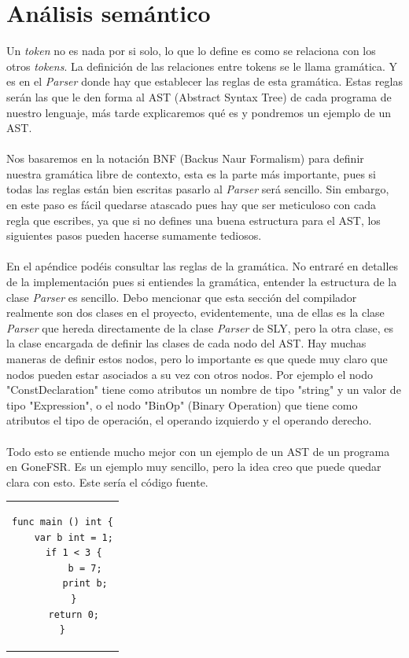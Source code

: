 \section{Análisis semántico}
Un \textit{token} no es nada por si solo, lo que lo define es como se relaciona con los otros \textit{tokens}. La definición de las relaciones entre tokens se le llama gramática. Y es en el \textit{Parser} donde hay que establecer las reglas de esta gramática. Estas reglas serán las que le den forma al AST (Abstract Syntax Tree) de cada programa de nuestro lenguaje, más tarde explicaremos qué es y pondremos un ejemplo de un AST.\\\\
Nos basaremos en la notación BNF (Backus Naur Formalism) para definir nuestra gramática libre de contexto, esta es la parte más importante, pues si todas las reglas están bien escritas pasarlo al \textit{Parser} será sencillo. Sin embargo, en este paso es fácil quedarse atascado pues hay que ser meticuloso con cada regla que escribes, ya que si no defines una buena estructura para el AST, los siguientes pasos pueden hacerse sumamente tediosos. \\\\
En el apéndice podéis consultar las reglas de la gramática. No entraré en detalles de la implementación pues si entiendes la gramática, entender la estructura de la clase \textit{Parser} es sencillo. Debo mencionar que esta sección del compilador realmente son dos clases en el proyecto, evidentemente, una de ellas es la clase \textit{Parser} que hereda directamente de la clase \textit{Parser} de SLY, pero la otra clase, es la clase encargada de definir las clases de cada nodo del AST. Hay muchas maneras de definir estos nodos, pero lo importante es que quede muy claro que nodos pueden estar asociados a su vez con otros nodos. Por ejemplo el nodo "ConstDeclaration" tiene como atributos un nombre de tipo "string" y un valor de tipo "Expression", o el nodo "BinOp" (Binary Operation) que tiene como atributos el tipo de operación, el operando izquierdo y el operando derecho.\\\\ 
Todo esto se entiende mucho mejor con un ejemplo de un AST de un programa en GoneFSR. Es un ejemplo muy sencillo, pero la idea creo que puede quedar clara con esto. Este sería el código fuente.
\begin{center}
\begin{tabular}{c}
\begin{lstlisting}
func main () int {
    var b int = 1;
    if 1 < 3 {
        b = 7;
        print b;
    }
    return 0;
}
\end{lstlisting}
\end{tabular}
\end{center}

